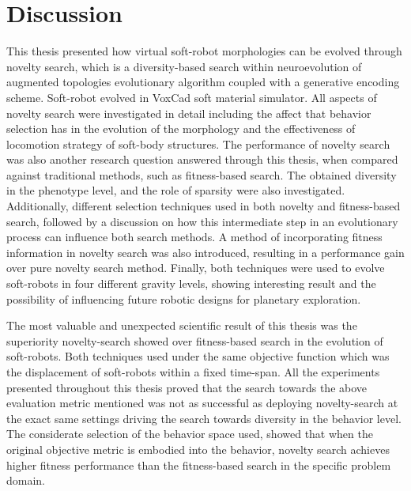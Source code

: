 

\chapter{Discussion} %

\label{Discussion} %


This thesis presented how virtual soft-robot morphologies can be evolved through novelty search, which is a diversity-based search within neuroevolution of augmented topologies evolutionary algorithm coupled with a generative encoding scheme. Soft-robot evolved in VoxCad soft material simulator. All aspects of novelty search were investigated in detail including the affect that behavior selection has in the evolution of the morphology and the effectiveness of locomotion strategy of soft-body structures. The performance of novelty search was also another research question answered through this thesis, when compared against traditional methods, such as fitness-based search. The obtained diversity in the phenotype level, and the role of sparsity were also investigated. Additionally, different selection techniques used in both novelty and fitness-based search, followed by a discussion on how this intermediate step in an evolutionary process can influence both search methods. A method of incorporating fitness information in novelty search was also introduced, resulting in a performance gain over pure novelty search method. Finally, both techniques were used to evolve soft-robots in four different gravity levels, showing interesting result and the possibility of influencing future robotic designs for planetary exploration.

The most valuable and unexpected scientific result of this thesis was the superiority novelty-search showed over fitness-based search in the evolution of soft-robots. Both techniques used under the same objective function which was the displacement of soft-robots within a fixed time-span. All the experiments presented throughout this thesis proved that the search towards the above evaluation metric mentioned was not as successful as deploying novelty-search at the exact same settings driving the search towards diversity in the behavior level. The considerate selection of the behavior space used, showed that when the original objective metric is embodied into the behavior, novelty search achieves higher fitness performance than the fitness-based search in the specific problem domain.

